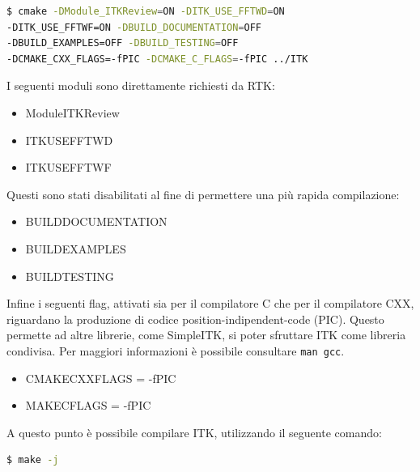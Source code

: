 \documentclass[a4paper,11pt, oneside]{article}
\begin{document}
                    \begin{lstlisting}[language=bash, frame=bt]
$ cmake -DModule_ITKReview=ON -DITK_USE_FFTWD=ON 
-DITK_USE_FFTWF=ON -DBUILD_DOCUMENTATION=OFF 
-DBUILD_EXAMPLES=OFF -DBUILD_TESTING=OFF 
-DCMAKE_CXX_FLAGS=-fPIC -DCMAKE_C_FLAGS=-fPIC ../ITK
                    \end{lstlisting}
                    
                    I seguenti moduli sono direttamente richiesti da RTK:
                    \begin{itemize}
                        \item Module\textunderscore ITKReview
                        \item ITK\textunderscore USE\textunderscore FFTWD
                        \item ITK\textunderscore USE\textunderscore FFTWF
                    \end{itemize}
                    
                    Questi sono stati disabilitati al fine di permettere una più rapida compilazione:
                    
                    \begin{itemize}
                        \item BUILD\textunderscore DOCUMENTATION
                        \item BUILD\textunderscore EXAMPLES
                        \item BUILD\textunderscore TESTING
                    \end{itemize}
                    
                    Infine i seguenti flag, attivati sia per il compilatore C che per il compilatore CXX, riguardano la produzione di codice position-indipendent-code (PIC). Questo permette ad altre librerie, come SimpleITK, si poter sfruttare ITK come libreria condivisa. Per maggiori informazioni è possibile consultare \texttt{man gcc}. 
                    
                    \begin{itemize}
                        \item CMAKE\textunderscore CXX\textunderscore FLAGS = -fPIC
                        \item MAKE\textunderscore C\textunderscore FLAGS = -fPIC
                    \end{itemize}
                    
                    \bigskip
                    A questo punto è possibile compilare ITK, utilizzando il seguente comando:
                    \begin{lstlisting}[language=bash, frame=bt]
$ make -j
                    \end{lstlisting}
                    
\end{document}
